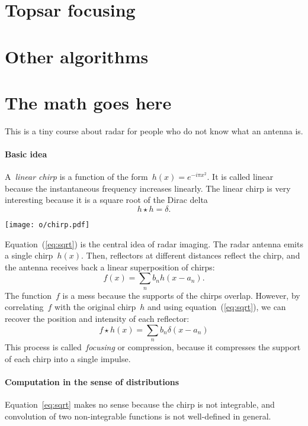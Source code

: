 \documentclass[a4paper]{article}           %
\newcommand{\1}{\mathbf{1}}
\begin{document}
\section{Topsar focusing}

\section{Other algorithms}

\clearpage
\appendix
\section{The math goes here}

This is a tiny course about radar for people who do not know what an antenna
is.

\paragraph{Basic idea}
A~\emph{linear chirp} is a function of the form~$h(x)=e^{-i\pi x^2}$.  It is
called linear because the instantaneous frequency increases linearly.
The linear chirp is very interesting because it is a square root of
the Dirac delta
\begin{equation}
	h\star h=\delta.
	\label{eq:sqrt}
\end{equation}

\texttt{[image: o/chirp.pdf]}

Equation~(\ref{eq:sqrt}) is the central idea of radar imaging.  The radar antenna
emits a single chirp~$h(x)$.  Then, reflectors at different distances reflect
the chirp, and the antenna receives back a linear superposition of chirps:
$$
f(x)=\sum_n b_n h(x-a_n).
$$
The function~$f$ is a mess because the supports of the chirps overlap.
However, by correlating~$f$ with the original chirp~$h$ and
using equation~(\ref{eq:sqrt}), we can recover the position and intensity of
each reflector:
$$
f\star h (x) = \sum_n b_n \delta(x - a_n)
$$
This process is called~\emph{focusing} or compression, because it
compresses the support of each chirp into a single impulse.

\paragraph{Computation in the sense of distributions}
Equation~\ref{eq:sqrt} makes no sense because the chirp is not integrable,
and convolution of two non-integrable functions is not well-defined
in general.
\end{document}
